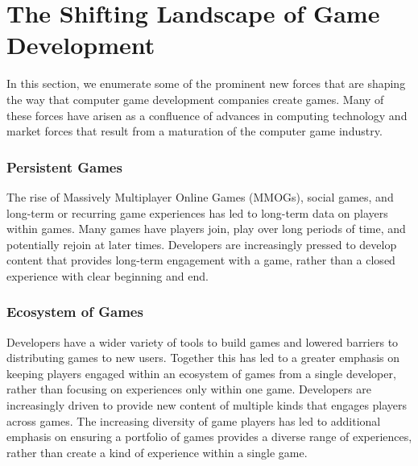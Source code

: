 \documentclass[conference]{IEEEtran}
\begin{document}

\section{The Shifting Landscape of Game Development}

In this section, we enumerate some of the prominent new forces that are shaping the way that computer game development companies create games. 
Many of these forces have arisen as a confluence of advances in computing technology and market forces that result from a maturation of the computer game industry.

\subsubsection{Persistent Games} 
The rise of Massively Multiplayer Online Games (MMOGs), social games, and long-term or recurring game experiences has led to long-term data on players within games. 
Many games have players join, play over long periods of time, and potentially rejoin at later times. 
Developers are increasingly pressed to develop content that provides long-term engagement with a game, rather than a closed experience with clear beginning and end.

\subsubsection{Ecosystem of Games}
Developers have a wider variety of tools to build games and lowered barriers to distributing games to new users. 
Together this has led to a greater emphasis on keeping players engaged within an ecosystem of games from a single developer, rather than focusing on experiences only within one game. 
Developers are increasingly driven to provide new content of multiple kinds that engages players across games. 
The increasing diversity of game players has led to additional emphasis on ensuring a portfolio of games provides a diverse range of experiences, rather than create a kind of experience within a single game.
\end{document}

